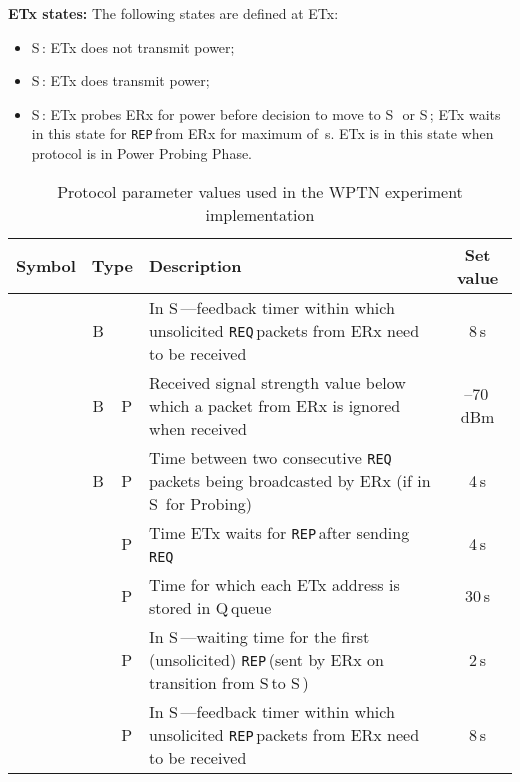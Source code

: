 \documentclass[11pt,draftclsnofoot,journal,onecolumn]{IEEEtran}
\newcommand{\textsubscript}[1]{}
\newcommand{\txStateOff}{\textsf{S\textsubscript{OFF}}\,}
\newcommand{\txStateOn}{\textsf{S\textsubscript{ON}}\,}
\newcommand{\txStateProbe}{\textsf{S\textsubscript{PROBE}}\,}
\newcommand{\rxStateIdle}{\textsf{S\textsubscript{IDLE}}\,}
\newcommand{\rxStateWaiting}{\textsf{S\textsubscript{WAIT}}\,}
\newcommand{\rxStateCharged}{\textsf{S\textsubscript{CHARGED}}\,}
\newcommand{\txTimeoutBeaconing}{}
\newcommand{\txTimeoutPowerProbeResponse}{}
\newcommand{\txTurnOffFirstPwrProbeNotReceivedAfter}{}
\newcommand{\txTimeoutProbeReceive}{}
\newcommand{\txRssiThreshold}{}
\newcommand{\rxDelayPing}{}
\newcommand{\rxDelayRemoveLastProbeSender}{}
\newcommand{\chargingRequest}{\texttt{REQ\textsubscript{CRG}}\,}
\newcommand{\powerProbeReport}{\texttt{REP\textsubscript{PWR}}\,}
\newcommand{\powerProbeRequest}{\texttt{REQ\textsubscript{PWR}}\,}
\newcommand{\txAddressQueue}{Q\textsubscript{TX}\,}
\newcommand{\subparagraph}{}
\begin{document}
\subparagraph{\textbf{ETx states:}} \label{sec:p1_etx_states} The following states are defined at ETx:

\begin{itemize}
\item \txStateOff: ETx does not transmit power;
\item \txStateOn: ETx does transmit power;
\item \txStateProbe: ETx probes ERx for power before decision to move to \txStateOff\ or \txStateOn; ETx waits in this state for \powerProbeReport from ERx for maximum of \txTimeoutPowerProbeResponse\,s. ETx is in this state when protocol is in Power Probing Phase.
\end{itemize}

\begin{table*}
\centering
\caption{Protocol parameter values used in the WPTN experiment implementation}
\vspace{-0.25cm}
\begin{threeparttable}
\begin{center}
\scriptsize
\begin{tabular}{| l | c c | l | c}
\hline
Symbol & \multicolumn{2}{c|}{Type\tnote{a}} & Description & Set value\\
\hline\hline
\txTimeoutBeaconing & B & & In \txStateOn---feedback timer within which unsolicited \chargingRequest packets from ERx need to be received & 8\,s\\
\hline
\txRssiThreshold & B & P & Received signal strength value below which a packet from ERx is ignored when received\tnote{b} & --70\,dBm\\
\hline
\rxDelayPing & B & P & Time between two consecutive \chargingRequest packets being broadcasted by ERx (if in \rxStateIdle\! for Probing) & 4\,s\\
\hline
\txTimeoutPowerProbeResponse & & P & Time ETx waits for \powerProbeReport after sending \powerProbeRequest & 4\,s\\
\hline
\rxDelayRemoveLastProbeSender & & P & Time for which each ETx address is stored in \txAddressQueue queue & 30\,s\\
\hline
\txTurnOffFirstPwrProbeNotReceivedAfter & & P & In \txStateOn---waiting time for the first (unsolicited) \powerProbeReport (sent by ERx on transition from \rxStateWaiting to \rxStateCharged\!) & 2\,s\\
\hline
\txTimeoutProbeReceive & & P & In \txStateOn---feedback timer within which unsolicited \powerProbeReport packets from ERx need to be received & 8\,s\\

\end{tabular}
\end{center}
\end{threeparttable}
\end{table*}
\end{document}
